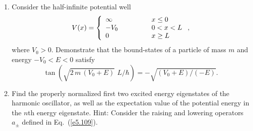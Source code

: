 {\begin{enumerate}
\item Consider the half-infinite potential well
$$
V(x) = \left\{\begin{array}{lll}
\infty&\mbox{\hspace{1cm}}&x\leq 0\\
-V_0&&0<x<L\\
0 &&x\geq L
\end{array}\right.,
$$
where $V_0> 0$. Demonstrate that the bound-states of a particle of
mass $m$ and energy $-V_0<E<0$ satisfy
$$
\tan\left(\sqrt{2\,m\,(V_0+E)}\,\,L/\hbar\right) = - \sqrt{(V_0+E)/(-E)}.
$$

\item Find the properly normalized first two excited energy eigenstates of
the harmonic oscillator, as well as  the expectation value of the potential energy in the $n$th energy eigenstate. Hint: Consider the raising and lowering operators $a_\pm$ defined
in Eq.~(\ref{e5.109}).

\end{enumerate}
}